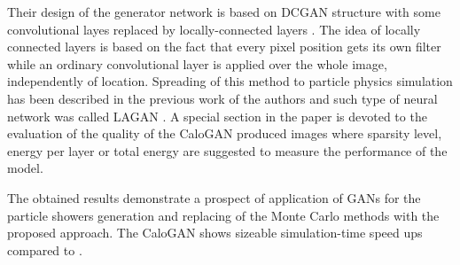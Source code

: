 Their design of the generator network is based on DCGAN structure \cite{radford2015unsupervised} with some convolutional layes replaced by locally-connected layers \cite{taigman2014deepface}. The idea of locally connected layers is based on the fact that every pixel position gets its own filter while an ordinary convolutional layer is applied over the whole image, independently of location. Spreading of this method to particle physics simulation has been described in the previous work of the authors and such type of neural network was called LAGAN \cite{de2017learning}. A special section in the paper is devoted to the evaluation of the quality of the CaloGAN produced images where  sparsity level,  energy per layer or total energy are suggested to measure the performance of the model. 

The obtained results demonstrate a prospect of application of GANs for the particle showers generation and replacing of the Monte Carlo methods with the proposed approach. The CaloGAN shows sizeable simulation-time speed ups compared to \geant. 

